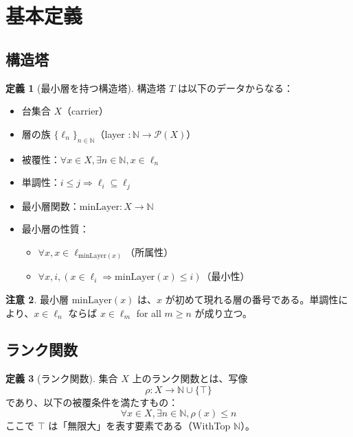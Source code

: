\documentclass[a4paper,11pt]{ltjsarticle}
\theoremstyle{definition}
\newtheorem{definition}{定義}[section]
\newtheorem{remark}[definition]{注意}
\begin{document}
\section{基本定義}

\subsection{構造塔}

\begin{definition}[最小層を持つ構造塔]\label{def:tower}
構造塔 $T$ は以下のデータからなる：
\begin{itemize}
\item 台集合 $X$（carrier）
\item 層の族 $\{\ell_n\}_{n \in \mathbb{N}}$（layer $: \mathbb{N} \to \mathcal{P}(X)$）
\item 被覆性：$\forall x \in X, \exists n \in \mathbb{N}, x \in \ell_n$
\item 単調性：$i \leq j \Rightarrow \ell_i \subseteq \ell_j$
\item 最小層関数：$\mathrm{minLayer} : X \to \mathbb{N}$
\item 最小層の性質：
\begin{itemize}
\item $\forall x, x \in \ell_{\mathrm{minLayer}(x)}$（所属性）
\item $\forall x, i, (x \in \ell_i \Rightarrow \mathrm{minLayer}(x) \leq i)$（最小性）
\end{itemize}
\end{itemize}
\end{definition}

\begin{remark}
最小層 $\mathrm{minLayer}(x)$ は、$x$ が初めて現れる層の番号である。単調性により、$x \in \ell_n$ ならば $x \in \ell_m$ for all $m \geq n$ が成り立つ。
\end{remark}

\subsection{ランク関数}

\begin{definition}[ランク関数]\label{def:rank}
集合 $X$ 上のランク関数とは、写像
\[
\rho : X \to \mathbb{N} \cup \{\top\}
\]
であり、以下の被覆条件を満たすもの：
\[
\forall x \in X, \exists n \in \mathbb{N}, \rho(x) \leq n
\]
ここで $\top$ は「無限大」を表す要素である（WithTop $\mathbb{N}$）。
\end{definition}
\end{document}
